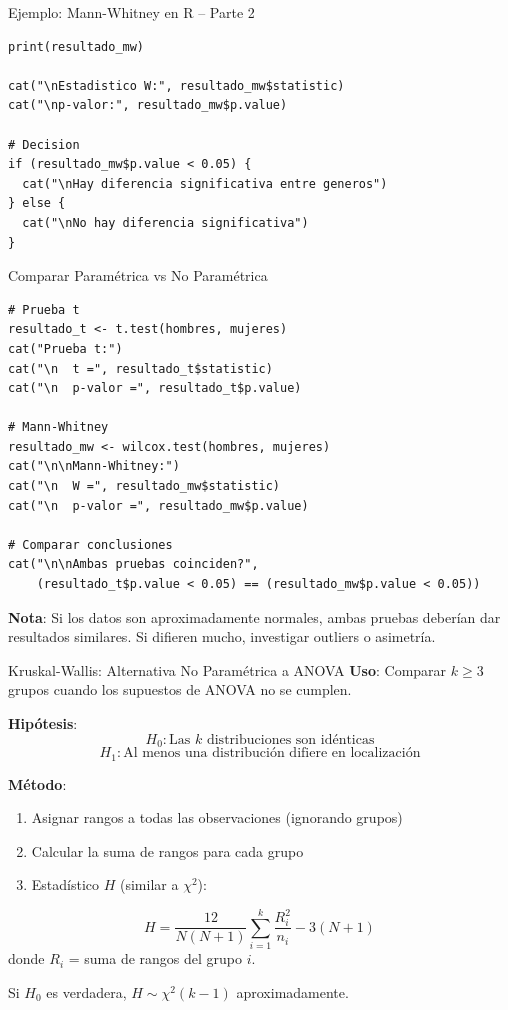 \documentclass[aspectratio=169, 11pt]{beamer}
\begin{document}
\begin{frame}[fragile]{Ejemplo: Mann-Whitney en R -- Parte 2}
\begin{lstlisting}
print(resultado_mw)

cat("\nEstadistico W:", resultado_mw$statistic)
cat("\np-valor:", resultado_mw$p.value)

# Decision
if (resultado_mw$p.value < 0.05) {
  cat("\nHay diferencia significativa entre generos")
} else {
  cat("\nNo hay diferencia significativa")
}
\end{lstlisting}
\end{frame}

\begin{frame}[fragile]{Comparar Paramétrica vs No Paramétrica}
\begin{lstlisting}
# Prueba t
resultado_t <- t.test(hombres, mujeres)
cat("Prueba t:")
cat("\n  t =", resultado_t$statistic)
cat("\n  p-valor =", resultado_t$p.value)

# Mann-Whitney
resultado_mw <- wilcox.test(hombres, mujeres)
cat("\n\nMann-Whitney:")
cat("\n  W =", resultado_mw$statistic)
cat("\n  p-valor =", resultado_mw$p.value)

# Comparar conclusiones
cat("\n\nAmbas pruebas coinciden?",
    (resultado_t$p.value < 0.05) == (resultado_mw$p.value < 0.05))
\end{lstlisting}

\vspace{0.3cm}
\small
\textbf{Nota}: Si los datos son aproximadamente normales, ambas pruebas deberían dar resultados similares. Si difieren mucho, investigar outliers o asimetría.
\end{frame}

\begin{frame}{Kruskal-Wallis: Alternativa No Paramétrica a ANOVA}
\textbf{Uso}: Comparar $k \geq 3$ grupos cuando los supuestos de ANOVA no se cumplen.

\vspace{0.3cm}
\textbf{Hipótesis}:
\[
H_0: \text{Las } k \text{ distribuciones son idénticas}
\]
\[
H_1: \text{Al menos una distribución difiere en localización}
\]

\vspace{0.3cm}
\textbf{Método}:
\begin{enumerate}
  \item Asignar rangos a todas las observaciones (ignorando grupos)
  \item Calcular la suma de rangos para cada grupo
  \item Estadístico $H$ (similar a $\chi^2$):
\end{enumerate}
\[
H = \frac{12}{N(N+1)} \sum_{i=1}^k \frac{R_i^2}{n_i} - 3(N+1)
\]
donde $R_i$ = suma de rangos del grupo $i$.

\vspace{0.3cm}
Si $H_0$ es verdadera, $H \sim \chi^2(k-1)$ aproximadamente.
\end{frame}
\end{document}
